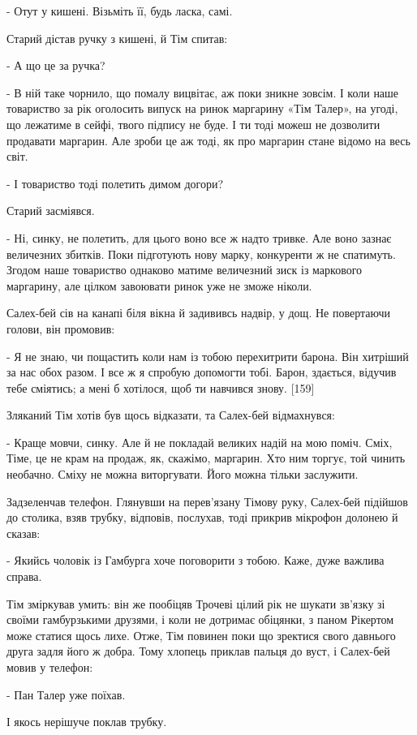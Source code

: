 - Отут у кишені. Візьміть її, будь ласка, самі.

Старий дістав ручку з кишені, й Тім спитав:

- А що це за ручка?

- В ній таке чорнило, що помалу вицвітає, аж поки зникне зовсім. І коли наше товариство за рік оголосить випуск на ринок маргарину «Тім Талер», на угоді, що лежатиме в сейфі, твого підпису не буде. І ти тоді можеш не дозволити продавати маргарин. Але зроби це аж тоді, як про маргарин стане відомо на весь світ.

- І товариство тоді полетить димом догори?

Старий засміявся.

- Ні, синку, не полетить, для цього воно все ж надто тривке. Але воно зазнає величезних збитків. Поки підготують нову марку, конкуренти ж не спатимуть. Згодом наше товариство однаково матиме величезний зиск із маркового маргарину, але цілком завоювати ринок уже не зможе ніколи.

Салех-бей сів на канапі біля вікна й задививсь надвір, у дощ. Не повертаючи голови, він промовив:

- Я не знаю, чи пощастить коли нам із тобою перехитрити барона. Він хитріший за нас обох разом. І все ж я спробую допомогти тобі. Барон, здається, відучив тебе сміятись; а мені б хотілося, щоб ти навчився знову. [159]

Зляканий Тім хотів був щось відказати, та Салех-бей відмахнувся:

- Краще мовчи, синку. Але й не покладай великих надій на мою поміч. Сміх, Тіме, це не крам на продаж, як, скажімо, маргарин. Хто ним торгує, той чинить необачно. Сміху не можна виторгувати. Його можна тільки заслужити.

Задзеленчав телефон. Глянувши на перев'язану Тімову руку, Салех-бей підійшов до столика, взяв трубку, відповів, послухав, тоді прикрив мікрофон долонею й сказав:

- Якийсь чоловік із Гамбурга хоче поговорити з тобою. Каже, дуже важлива справа.

Тім зміркував умить: він же пообіцяв Трочеві цілий рік не шукати зв'язку зі своїми гамбурзькими друзями, і коли не дотримає обіцянки, з паном Рікертом може статися щось лихе. Отже, Тім повинен поки що зректися свого давнього друга задля його ж добра. Тому хлопець приклав пальця до вуст, і Салех-бей мовив у телефон:

- Пан Талер уже поїхав.

І якось нерішуче поклав трубку.

